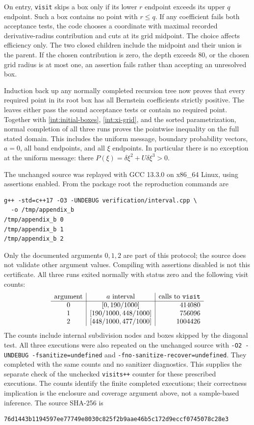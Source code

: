 On entry, \texttt{visit} skips a box only if its lower $r$ endpoint
exceeds its upper $q$ endpoint.  Such a box contains no point with
$r\le q$.  If any coefficient fails both acceptance tests, the code
chooses a coordinate with maximal recorded derivative-radius
contribution and cuts at its grid midpoint.  The choice affects
efficiency only.  The two closed children include the midpoint and
their union is the parent.  If the chosen contribution is zero, the
depth exceeds $80$, or the chosen grid radius is at most one, an
assertion fails rather than accepting an unresolved box.

Induction back up any normally completed recursion tree now proves
that every required point in its root box has all Bernstein
coefficients strictly positive.  The leaves either pass the sound
acceptance tests or contain no required point.  Together with
\eqref{int:initial-boxes}, \eqref{int:xi-grid}, and the sorted
parametrization, normal completion of all three runs proves the
pointwise inequality on the full stated domain.  This includes the
uniform message, boundary probability vectors, $a=0$, all band
endpoints, and all $\xi$ endpoints.  In particular there is no
exception at the uniform message: there $P(\xi)=\delta\xi^2+
U\delta\xi^3>0$.

\label{int:execution}
The unchanged source was replayed with GCC 13.3.0 on x86\_64 Linux,
using assertions enabled.  From the package root the reproduction
commands are
\begin{verbatim}
g++ -std=c++17 -O3 -UNDEBUG verification/interval.cpp \
  -o /tmp/appendix_b
/tmp/appendix_b 0
/tmp/appendix_b 1
/tmp/appendix_b 2
\end{verbatim}
Only the documented arguments $0,1,2$ are part of this protocol;
the source does not validate other argument values.  Compiling with
assertions disabled is not this certificate.  All three runs exited
normally with status zero and the following visit counts:
\[
 \begin{array}{c|c|r}
 \text{argument}&a\text{ interval}&\text{calls to \texttt{visit}}\\ \hline
 0&[0,190/1000]&414080\\
 1&[190/1000,448/1000]&756096\\
 2&[448/1000,477/1000]&1004426
 \end{array}
\]
The counts include internal subdivision nodes and boxes skipped by
the diagonal test. All three executions were also repeated on the
unchanged source with \texttt{-O2 -UNDEBUG -fsanitize=undefined}
and \texttt{-fno-sanitize-recover=undefined}. They completed with the
same counts and no sanitizer diagnostics. This supplies the separate
check of the unchecked \texttt{visits++} counter for these prescribed
executions. The counts identify the finite completed executions;
their correctness implication is the enclosure and coverage argument
above, not a sample-based inference.  The source SHA-256 is
\begin{verbatim}
76d1443b1194597ee77749e8030c825f2b9aae46b5c172d9eccf0745078c28e3
\end{verbatim}

